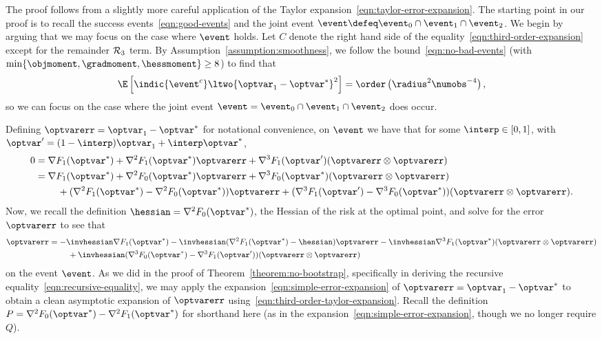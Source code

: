 \documentclass[11pt,twoside]{article}
\theoremstyle{definition}
\begin{document}
\newcommand{\graddiff}{\mathsf{G}}
\newcommand{\littlegraddiff}{\mathsf{g}}

The proof follows from a slightly more careful application of the Taylor
expansion~\eqref{eqn:taylor-error-expansion}.  The starting point in our
proof is to recall the success events~\eqref{eqn:good-events} and the joint
event $\event \defeq \event_0 \cap \event_1 \cap \event_2$. We begin by
arguing that we may focus on the case where $\event$ holds. Let $C$ denote
the right hand side of the equality~\eqref{eqn:third-order-expansion}
except for the remainder $\mathcal{R}_3$ term.  By
Assumption~\ref{assumption:smoothness}, we follow
the bound~\eqref{eqn:no-bad-events} (with $\min\{\objmoment, \gradmoment, \hessmoment\} \ge 8$)
to find that
\begin{equation*}
  \E\left[\indic{\event^c} \ltwo{\optvar_1 - \optvar^*}^2\right]
  = \order\left(\radius^2 \numobs^{-4}\right),
\end{equation*}
so we can focus on the case where the joint event
$\event = \event_0 \cap \event_1 \cap \event_2$ does occur.

Defining $\optvarerr = \optvar_1 - \optvar^*$ for notational
convenience, on $\event$ we have that for some $\interp \in [0, 1]$, with
$\optvar' = (1 - \interp) \optvar_1 + \interp \optvar^*$,
\begin{align*}
  0 & = \nabla F_1(\optvar^*) +
  \nabla^2 F_1(\optvar^*)\optvarerr
  + \nabla^3 F_1(\optvar')(\optvarerr \otimes \optvarerr) \\
  & = \nabla F_1(\optvar^*) +
  \nabla^2 F_0(\optvar^*)\optvarerr
  + \nabla^3 F_0(\optvar^*)(\optvarerr \otimes \optvarerr) \\
  & \qquad ~ + (\nabla^2 F_1(\optvar^*) - \nabla^2 F_0(\optvar^*)) \optvarerr
  + (\nabla^3 F_1(\optvar') - \nabla^3 F_0(\optvar^*))(\optvarerr
  \otimes \optvarerr).
\end{align*}
Now, we recall the definition $\hessian = \nabla^2 F_0(\optvar^*)$, the
Hessian of the risk at the optimal point, and solve for the error
$\optvarerr$ to see that
\begin{align}
  \optvarerr & =
  -\invhessian \nabla F_1(\optvar^*)
  - \invhessian(\nabla^2 F_1(\optvar^*) - \hessian) \optvarerr
  - \invhessian \nabla^3 F_1(\optvar^*)(\optvarerr \otimes \optvarerr)
  \nonumber \\
  & \qquad ~
  + \invhessian (\nabla^3 F_0(\optvar^*) - \nabla^3 F_1(\optvar'))
  (\optvarerr \otimes \optvarerr)
  \label{eqn:third-order-taylor-expansion}
\end{align}
on the event $\event$.
As we did in the proof of Theorem~\ref{theorem:no-bootstrap}, specifically
in deriving the recursive equality~\eqref{eqn:recursive-equality}, we may
apply the expansion~\eqref{eqn:simple-error-expansion} of $\optvarerr =
\optvar_1 - \optvar^*$ to obtain a clean asymptotic expansion of
$\optvarerr$ using~\eqref{eqn:third-order-taylor-expansion}. Recall the
definition $P = \nabla^2 F_0(\optvar^*) - \nabla^2 F_1(\optvar^*)$ for
shorthand here (as in the expansion~\eqref{eqn:simple-error-expansion},
though we no longer require $Q$).
\end{document}
